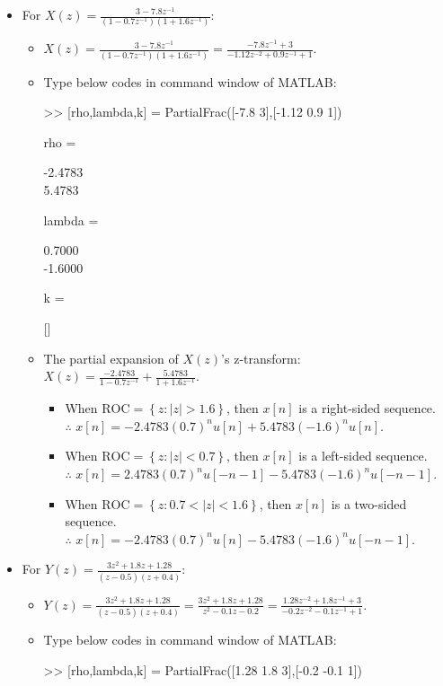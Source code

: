 \documentclass[onecolumn,oneside]{SUSTechHomework}
\begin{document}
\begin{itemize}
    \item For $X(z)=\frac{3-7.8 z^{-1}}{\left(1-0.7 z^{-1}\right)\left(1+1.6 z^{-1}\right)}$:
    \begin{itemize}
        \item $X(z)=\frac{3-7.8 z^{-1}}{\left(1-0.7 z^{-1}\right)\left(1+1.6 z^{-1}\right)}=\frac{-7.8z^{-1}+3}{-1.12z^{-2}+0.9z^{-1}+1}$.
        \item Type below codes in command window of MATLAB:
        \begin{commandline}
            >> [rho,lambda,k] = PartialFrac([-7.8 3],[-1.12 0.9 1])

            rho =
            
               -2.4783\\
                5.4783
            
            
            lambda =
            
                0.7000\\
               -1.6000
            
            
            k =
            
                 []
        \end{commandline}
        \item The partial expansion of $X(z)$'s z-transform: $X(z)=\frac{-2.4783}{1-0.7z^{-1}}+\frac{5.4783}{1+1.6z^{-1}}$.
        \begin{itemize}
            \item When $\text{ROC}=\left\{z:|z|>1.6\right\}$, then $x[n]$ is a right-sided sequence.\\
             $\therefore$ $x[n]=-2.4783(0.7)^nu[n]+5.4783(-1.6)^nu[n]$.
            \item When $\text{ROC}=\left\{z:|z|<0.7\right\}$, then $x[n]$ is a left-sided sequence.\\
            $\therefore$ $x[n]=2.4783(0.7)^nu[-n-1]-5.4783(-1.6)^nu[-n-1]$.
            \item When $\text{ROC}=\left\{z:0.7<|z|<1.6\right\}$, then $x[n]$ is a two-sided sequence.\\
            $\therefore$ $x[n]=-2.4783(0.7)^nu[n]-5.4783(-1.6)^nu[-n-1]$.
        \end{itemize}
    \end{itemize}
    \item For $Y(z)=\frac{3 z^{2}+1.8 z+1.28}{(z-0.5)(z+0.4)}$:
    \begin{itemize}
        \item $Y(z)=\frac{3 z^{2}+1.8 z+1.28}{(z-0.5)(z+0.4)}=\frac{3 z^{2}+1.8 z+1.28}{z^2-0.1z-0.2}=\frac{1.28z^{-2}+1.8z^{-1}+3}{-0.2z^{-2}-0.1z^{-1}+1}$.
        \item Type below codes in command window of MATLAB:
        \begin{commandline}
            >> [rho,lambda,k] = PartialFrac([1.28 1.8 3],[-0.2 -0.1 1])


\end{commandline}
\end{itemize}
\end{itemize}
\end{document}
